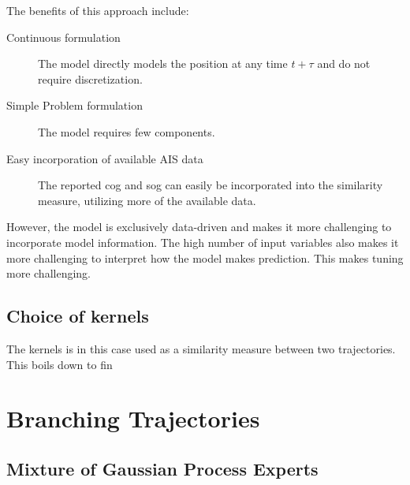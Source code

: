 The benefits of this approach include:
\begin{description}
    \item[Continuous formulation] The model directly models the position at any time $t+\tau$ and do not require discretization. 
    \item[Simple Problem formulation] The model requires few components.
    \item[Easy incorporation of available AIS data] The reported \acrshort{cog} and \acrshort{sog} can easily be incorporated into the similarity measure, utilizing more of the available data.
\end{description}

However, the model is exclusively data-driven and makes it more challenging to incorporate model information. The high number of input variables also makes it more challenging to interpret how the model makes prediction. This makes tuning more challenging.

\subsection{Choice of kernels}
The kernels is in this case used as a similarity measure between two trajectories. This boils down to fin




\section{Branching Trajectories}


\subsection{Mixture of Gaussian Process Experts}

